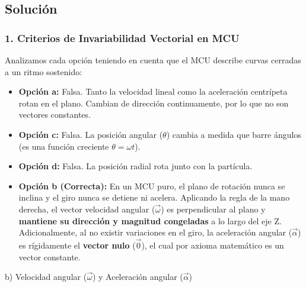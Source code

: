 \documentclass[12pt, a4paper]{article}
\begin{document}
\subsection*{Solución}

\subsubsection*{1. Criterios de Invariabilidad Vectorial en MCU}
Analizamos cada opción teniendo en cuenta que el MCU describe curvas cerradas a un ritmo sostenido:
\begin{itemize}
    \item \textbf{Opción a:} Falsa. Tanto la velocidad lineal como la aceleración centrípeta rotan en el plano. Cambian de dirección continuamente, por lo que no son vectores constantes.
    \item \textbf{Opción c:} Falsa. La posición angular ($\theta$) cambia a medida que barre ángulos (es una función creciente $\theta = \omega t$).
    \item \textbf{Opción d:} Falsa. La posición radial rota junto con la partícula.
    \item \textbf{Opción b (Correcta):} En un MCU puro, el plano de rotación nunca se inclina y el giro nunca se detiene ni acelera. Aplicando la regla de la mano derecha, el vector velocidad angular ($\vec{\omega}$) es perpendicular al plano y \textbf{mantiene su dirección y magnitud congeladas} a lo largo del eje Z. Adicionalmente, al no existir variaciones en el giro, la aceleración angular ($\vec{\alpha}$) es rígidamente el \textbf{vector nulo} ($\vec{0}$), el cual por axioma matemático es un vector constante.
\end{itemize}

\begin{tcolorbox}[colback=green!5!white, colframe=green!50!black, title=Respuesta Final]
\centering \Large b) Velocidad angular ($\vec{\omega}$) y Aceleración angular ($\vec{\alpha}$)
\end{tcolorbox}
\end{document}
